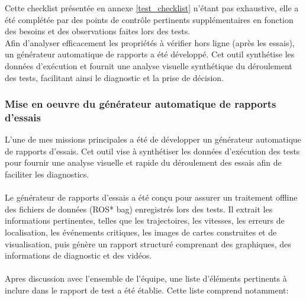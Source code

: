 \indent Cette checklist présentée en annexe  \hyperref[annexe4]{[test\_checklist]} n'étant pas exhaustive, elle a été complétée par des points de contrôle pertinents supplémentaires en fonction des besoins et des observations faites lors des tests.\\

\indent Afin d'analyser efficacement les propriétés à vérifier hors ligne (après les essais), un générateur automatique de rapports a été développé. Cet outil synthétise les données d'exécution et fournit une analyse visuelle synthétique du déroulement des tests, facilitant ainsi le diagnostic et la prise de décision.\\

\subsubsection{Mise en oeuvre du générateur automatique de rapports d'essais}

L'une de mes missions principales a été de développer un générateur automatique de rapports d'essais. Cet outil vise à synthétiser les données d'exécution des tests pour fournir une analyse visuelle et rapide du déroulement des essais afin de faciliter les diagnostics.\\\\
\indent Le générateur de rapports d'essais a été conçu pour assurer un traitement offline des fichiers de données (ROS* bag) enregistrés lors des tests. Il extrait les informations pertinentes, telles que les trajectoires, les vitesses, les erreurs de localisation, les événements critiques, les images de cartes construites et de visualisation, puis génère un rapport structuré comprenant des graphiques, des informations de diagnostic et des vidéos.\\\\
\indent Apres discussion avec l'ensemble de l'équipe, une liste d'éléments pertinents à inclure dans le rapport de test a été établie. Cette liste comprend notamment:\\

